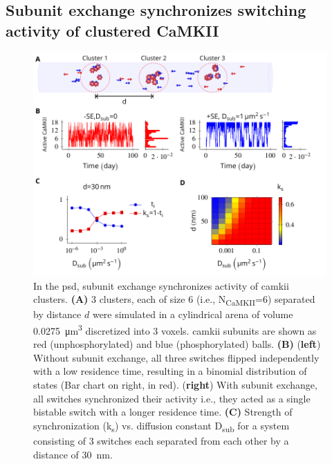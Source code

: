 \documentclass[9pt,lineno,doublespacing]{elife}
\newcommand\SUB[2]{#1\textsubscript{#2}}
\begin{document}

\subsection{Subunit exchange synchronizes switching activity of clustered CaMKII}
\label{subsec:se_sync_switches}

\begin{figure}%
    \includegraphics[width=0.95\linewidth]{./PaperFigures/elifeFigure5/figure_sync_150mm.pdf}
    \caption{In the \gls{psd}, subunit exchange synchronizes activity of
        \gls{camkii} clusters. 
        \textbf{(A)} 3 clusters, each of size 6 (i.e.,
        \SUB{N}{CaMKII}=6) separated by distance \(d\) were simulated in a
        cylindrical arena of volume \SI{0.0275}{\micro\meter^3} discretized
        into 3 voxels. \Gls{camkii} subunits are shown as red 
        (unphosphorylated) and blue (phosphorylated) balls. 
        \textbf{(B)} (\textbf{left}) Without subunit exchange, all three
        switches flipped independently with a low residence time, resulting in a
        binomial distribution of states (Bar chart on right, in red). (\textbf{right})
        With subunit exchange, all switches synchronized their activity i.e.,
        they acted as a single bistable switch with a longer residence time.
        \textbf{(C)} Strength of synchronization (\SUB{k}{s})
        vs. diffusion constant \SUB{D}{sub} for a system consisting of 3 switches
        each separated from each other by a distance of \SI{30}{\nano \meter}.
}
\end{figure}
\end{document}
